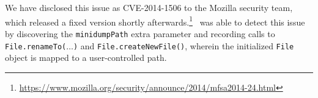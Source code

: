 We have disclosed this issue as CVE-2014-1506 to the Mozilla security team, which released a fixed version shortly afterwards.\footnote{\url{https://www.mozilla.org/security/announce/2014/mfsa2014-24.html}} 
	\Tool\ was able to detect this issue by discovering the {\tt minidumpPath} extra parameter and recording calls to {\tt File.renameTo($\ldots$)} and {\tt File.createNewFile()}, wherein the initialized {\tt File} object is mapped to  a user-controlled path.